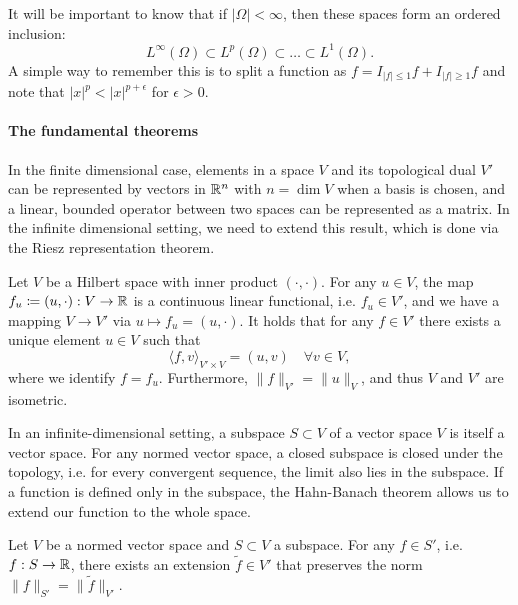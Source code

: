 It will be important to know that if $|\Omega|<\infty$, then these spaces form an ordered inclusion: 
\begin{equation}
    L^\infty(\Omega) \subset L^p(\Omega) \subset \dots \subset L^1(\Omega).
\end{equation}
A simple way to remember this is to split a function as $f = I_{|f|\leq 1}f + I_{|f|\geq 1}f$ and note that $|x|^p < |x|^{p+\epsilon}$ for $\epsilon > 0$. 

\paragraph{The fundamental theorems}
In the finite dimensional case, elements in a space $V$ and its topological dual $V'$ can be represented by vectors in $\mathbb{R}^n$ with $n=\dim V$ when a basis is chosen, and a linear, bounded operator between two spaces can be represented as a matrix. In the infinite dimensional setting, we need to extend this result, which is done via the Riesz representation theorem. 

\begin{theorem}\label{thm:riesz-representation}
    Let $V$ be a Hilbert space with inner product $(\cdot,\cdot)$. For any $u\in V$, the map $f_u\coloneqq (u,\cdot):V\to \mathbb{R}$ is a continuous linear functional, i.e. $f_u\in V'$, and we have a mapping $V\to V'$ via $u\mapsto f_u=(u,\cdot)$. It holds that for any $f\in V'$ there exists a unique element $u\in V$ such that 
    \begin{equation}
        \langle f, v\rangle_{V'\times V} = (u,v)\quad \forall v\in V,
    \end{equation}
    where we identify $f=f_u$. Furthermore, $\|f\|_{V'} = \|u\|_V$, and thus $V$ and $V'$ are isometric.
\end{theorem}

In an infinite-dimensional setting, a subspace $S\subset V$ of a vector space $V$ is itself a vector space. For any normed vector space, a closed subspace is closed under the topology, i.e. for every convergent sequence, the limit also lies in the subspace. If a function is defined only in the subspace, the Hahn-Banach theorem allows us to extend our function to the whole space. 
\begin{theorem}\label{thm:hahn-banach}
    Let $V$ be a normed vector space and $S\subset V$ a subspace. For any $f\in S'$, i.e. $f:S\to\mathbb{R}$, there exists an extension $\tilde{f}\in V'$ that preserves the norm $\|f\|_{S'} = \|\tilde{f}\|_{V'}$.
\end{theorem}

